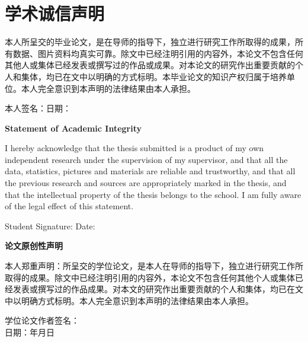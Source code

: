 
\ifx \degree \bachelor
\chapter*{学术诚信声明}
\fontsize{15}{20}\selectfont
	本人所呈交的毕业论文，是在导师的指导下，独立进行研究工作所取得的成果，所有数据、图片资料均真实可靠。除文中已经注明引用的内容外，本论文不包含任何其他人或集体已经发表或撰写过的作品或成果。对本论文的研究作出重要贡献的个人和集体，均已在文中以明确的方式标明。本毕业论文的知识产权归属于培养单位。本人完全意识到本声明的法律结果由本人承担。
\vspace{2\baselineskip}
	
本人签名：\hfill 日期： \hspace{4cm}

\vspace{2\baselineskip}

\begin{center}
	{\bfseries Statement of Academic Integrity}
\end{center}

I hereby acknowledge that the thesis submitted is a product of my own independent research under the supervision of my supervisor, and that all the data, statistics, pictures and materials are reliable and trustworthy, and that all the previous research and sources are appropriately marked in the thesis, and that the intellectual property of the thesis belongs to the school. I am fully aware of the legal effect of this statement.

\vspace{2\baselineskip}

Student Signature: \hfill Date: \hspace{4cm}

\else
\begin{center}
\vspace*{20pt}
\bfseries 论文原创性声明
\end{center}
\fontsize{15}{20}\selectfont

本人郑重声明：所呈交的学位论文，是本人在导师的指导下，独立进行研究工作所取得的成果。除文中已经注明引用的内容外，本论文不包含任何其他个人或集体已经发表或撰写过的作品成果。对本文的研究作出重要贡献的个人和集体，均已在文中以明确方式标明。本人完全意识到本声明的法律结果由本人承担。
\vskip 10pt
\ifx \disclaim \zero
\begin{flushleft}
\hfill 学位论文作者签名：\makebox[6em]{} \\
\hfill 日期：\hspace{1em}年\hspace{1em}月\hspace{1em}日
\end{flushleft}
\fi

